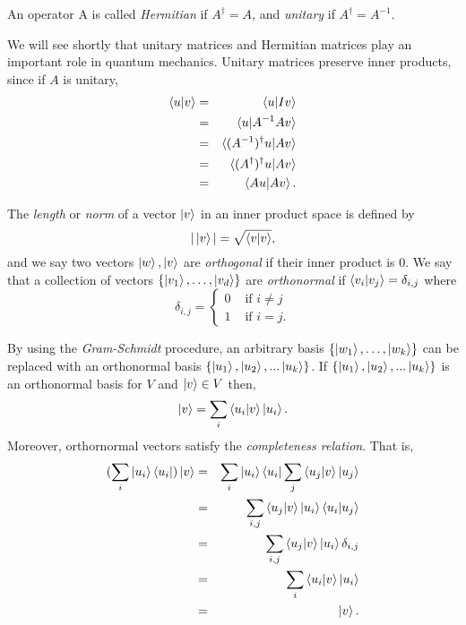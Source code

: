 \begin{definition}
\label{def herm}
An operator A is called \textit{Hermitian} if $A^\dagger = A$, and \textit{unitary} if $A^\dagger =A^{-1}$. 
\end{definition}
We will see shortly that unitary matrices and Hermitian matrices play an important role in quantum mechanics.  Unitary matrices preserve inner products, since if $A$ is unitary,
\begin{eqnarray}
\braket{u|v} &=& \braket{u|Iv}\\
&=& \braket{u|A^{-1}Av}\\
&=& \braket{(A^{-1})^\dagger u|Av}\\
&=& \braket{(A^\dagger)^\dagger u|Av}\\
&=& \braket{Au|Av}.
\end{eqnarray}

The \textit{length} or \textit{norm} of a vector $\ket{v}$ in an inner product space is defined by
\begin{equation}
    |\ket{v}|=\sqrt{\braket{v|v}},
\end{equation}
and we say two vectors $\ket{w}, \ket{v}$ are \textit{orthogonal} if their inner product is 0.  We say that a collection of vectors $\{\ket{v_1},\hdots,\ket{v_d}\}$  are \textit{orthonormal} if $\braket{v_i | v_j}={\delta}_{i,j}$ where 
$${\delta}_{i,j}=
\begin{cases} 0 & \textrm{ if }i\neq j\\
1 & \textrm{ if } i=j.
\end{cases}$$


By using the \textit{Gram-Schmidt} procedure, an arbitrary basis $\{\ket{w_1},\hdots,\ket{w_k}\}$ can be replaced with an orthonormal basis $\{\ket{u_1}, \ket{u_2}, ...\ket{u_k}\}$.  If $\{\ket{u_1}, \ket{u_2}, ...\ket{u_k}\}$ is an orthonormal basis for $V$ and $\ket{v} \in V$ then, 
$$\ket{v}=\sum\limits_i\braket{u_i|v}\ket{u_i} .$$
Moreover, orthornormal vectors satisfy the \textit{completeness relation}.  That is, 
\begin{eqnarray*}
    (\sum_i \ket{u_i}\bra{u_i})\ket{v}&=&
    \sum_i \ket{u_i}\bra{u_i}\sum_j \braket{u_j|v} \ket{u_j}\\
    &=& \sum_{i,j}\braket{u_j|v}\ket{u_i}\braket{u_i|u_j}\\
    &=& \sum_{i,j}\braket{u_j|v}\ket{u_i}\delta_{i,j}\\
    &=&\sum_i \braket{u_i|v}\ket{u_i}\\
    &=&\ket{v}.
\end{eqnarray*}



